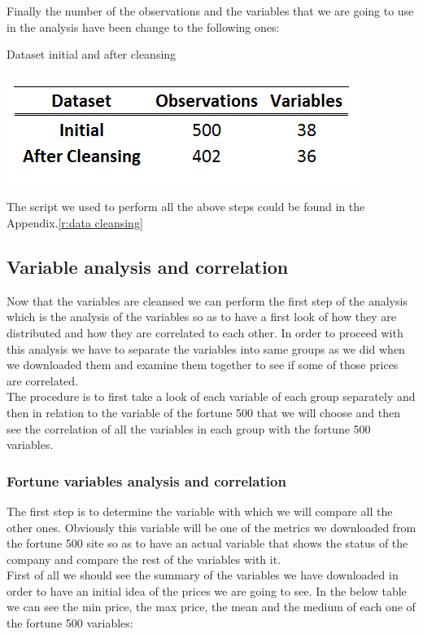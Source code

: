 \documentclass{book}
\begin{document}
Finally the number of the observations and the variables that we are going to use in the analysis have been change to the following ones:
\begin{table}[H]
\centering
\caption{Dataset initial and after cleansing}
\includegraphics[scale=0.6]{../R/photos/002_dataset.PNG} 
\end{table}
The script we used to perform all the above steps could be found in the Appendix.\ref{r:data cleansing}
\subsection{Variable analysis and correlation}
Now that the variables are cleansed we can perform the first step of the analysis which is the analysis of the variables so as to have a first look of how they are distributed and how they are correlated to each other. In order to proceed with this analysis we have to separate the variables into same groups as we did when we downloaded them and examine them together to see if some of those prices are correlated.\\
The procedure is to first take a look of each variable of each group separately and then in relation to the variable of the fortune 500 that we will choose and then see the correlation of all the variables in each group with the fortune 500 variables.
\subsubsection{Fortune variables analysis and correlation}
The first step is to determine the variable with which we will compare all the other ones. Obviously this variable will be one of the metrics we downloaded from the fortune 500 site so as to have an actual variable that shows the status of the company and compare the rest of the variables with it.\\
First of all we should see the summary of the variables we have downloaded in order to have an initial idea of the prices we are going to see. In the below table we can see the min price, the max price, the mean and the medium of each one of the fortune 500 variables:
\end{document}
